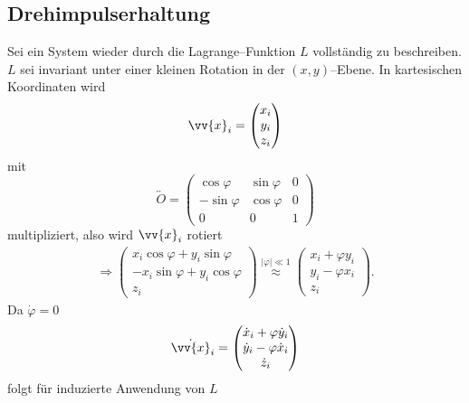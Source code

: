 \documentclass[a4paper,12pt]{article}
\numberwithin{equation}{section}
\begin{document}
\subsection{Drehimpulserhaltung}
Sei ein System wieder durch die Lagrange--Funktion $L$ vollständig zu beschreiben. $L$ sei invariant unter einer kleinen Rotation in der $(x,y)$--Ebene. In kartesischen Koordinaten wird
\begin{align*}
        \vv{x}_i=\begin{pmatrix} x_i\\y_i\\z_i \end{pmatrix}
\end{align*}
mit 
\[ 
        \overleftrightarrow{O}=\begin{pmatrix} \cos \varphi &\sin \varphi &0\\-\sin \varphi &\cos \varphi &0\\0&0&1 \end{pmatrix}
\] 
multipliziert, also wird $\vv{x}_i$ rotiert
\begin{align*}
        \Rightarrow \begin{pmatrix} x_i\cos \varphi +y_i\sin \varphi \\-x_i\sin \varphi +y_i\cos \varphi \\z_i \end{pmatrix}\stackrel{|\varphi |\ll 1}{\approx } \begin{pmatrix} x_i+\varphi y_i\\y_i-\varphi x_i\\z_i \end{pmatrix}
.\end{align*}
Da $\dot{\varphi }=0$ 
\begin{align*}
        \dot{\vv{x}}_i=\begin{pmatrix} \dot{x}_i+\varphi \dot{y}_i\\\dot{y}_i-\varphi \dot{x}_i\\\dot{z}_i \end{pmatrix}
\end{align*}
folgt für induzierte Anwendung von $L$
\end{document}
